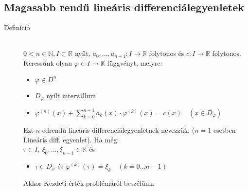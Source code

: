 \documentclass[margin=0px]{article}
\newcommand{\R}{\mathbb{R}}
\begin{document}
\subsection{Magasabb rendű lineáris differenciálegyenletek}
\begin{description}
    \item[Definíció] \hfill \\
        $ 0 < n \in \mathbb{N}, I \subset \R$ nyílt, $ a_0, ... ,a_{n-1} :I \rightarrow \R$  folytonos és $ c: I \rightarrow \R$ folytonos. \\
        Keressünk olyan $ \varphi \in I \rightarrow \mathbb{K}$ függvényt, melyre:
        \begin{itemize}
            \item $ \varphi \in D^n$
            \item $ D_{\varphi}$ nyílt intervallum
            \item $ \varphi^{(n)}(x) + \sum\limits_{k=0}^{n-1}a_k(x) \cdot \varphi^{(k)}(x) = c(x) \quad (x \in D_{\varphi}) $
        \end{itemize}

        Ezt $n$-edrendű lineáris differenciálegyenletnek nevezzük. ($n=1$ esetben Lineáris diff. egyenlet). Ha még: \\
        $ \tau \in I, \ \xi_0, ... , \xi_{n-1} \in \mathbb{K}$ és
        \begin{itemize}
            \item $ \tau \in D_{\varphi}$ és $ \varphi^{(k)}(\tau) = \xi_k \quad (k = 0...n-1) $
        \end{itemize}
        Akkor Kezdeti érték problémáról beszélünk.


\end{description}
\end{document}
